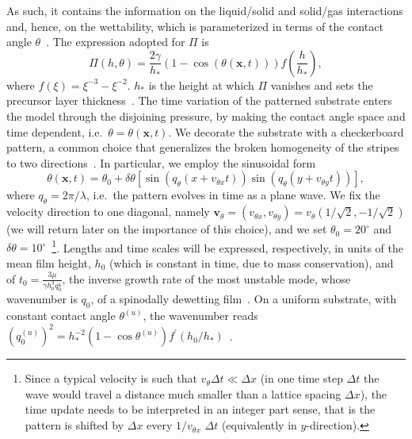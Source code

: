 \documentclass[amsmath,amssymb,showpacs,prf,superscriptaddress, longbibliography]{revtex4-1} %
\begin{document}
As such, it contains the information on the liquid/solid and solid/gas interactions and, hence, on the wettability, which is parameterized in terms of the contact angle $\theta$~\cite{bonnWettingSpreading2009, schwartzSimulationDropletMotion1998}. 
The expression adopted for $\Pi$ is
\begin{equation}\label{eq:disjoinpressure}
\Pi(h,\theta) = \frac{2\gamma}{h_{\ast}}(1-\cos(\theta(\mathbf{x},t)))
  f\left(\frac{h}{h_{\ast}}\right),
\end{equation}
where $f(\xi)=\xi^{-3} - \xi^{-2}$. $h_{\ast}$ is the height at which $\Pi$ vanishes and sets the precursor layer thickness~\cite{SuppMat}.
The time variation of the patterned substrate enters the model through the disjoining pressure, by making the contact angle space and time dependent, i.e.~$\theta = \theta(\mathbf{x},t)$.
We decorate the substrate with a checkerboard pattern, a common choice that generalizes the broken homogeneity of the stripes to two 
directions~\cite{jalaliFabricationCharacterizationScalable2018,nagayamaIntermediateWettingState2020,dasSurfacedirectedSpinodalDecomposition2020}.
In particular, we employ the sinusoidal form
\begin{equation}\label{eq:sinetheta}
   \!\! \theta(\mathbf{x},t) = \theta_0 + \delta\theta\left[\sin\left(q_{\theta} (x+v_{\theta x}t)\right)\sin\left(q_{\theta}(y+v_{\theta y}t)\right)\right],\! 
\end{equation}
where $q_{\theta} = 2\pi/\lambda$, i.e.~the pattern evolves in time as a plane wave.
We fix the velocity direction to one diagonal, namely $\mathbf{v}_{\theta} = (v_{\theta x},v_{\theta y}) = v_{\theta}(1/\sqrt{2},-1/\sqrt{2})$ (we will return later on the importance of this choice), and we set $\theta_0 = 20^{\circ}$ and $\delta\theta=10^{\circ}$~\footnote{Since a typical velocity is such that $v_{\theta} \Delta t \ll \Delta x$ (in one time step $\Delta t$ the wave would travel a distance much smaller than a lattice spacing $\Delta x$),
the time update needs to be interpreted in an integer part sense, that is the pattern is shifted by $\Delta x$ every $1/v_{\theta x}$ $\Delta t$ (equivalently in $y$-direction).}.
Lengths and time scales will be expressed, respectively, in units of the mean film height, $h_0$ (which is constant in time, due to mass conservation), and of $t_0 = \frac{3\mu}{\gamma h_0^3 q_0^4}$, the inverse growth rate of the most unstable mode, whose wavenumber is $q_0$, of a spinodally dewetting film~\cite{meckeThermalFluctuationsThin2005}. 
On a uniform substrate, with constant contact angle $\theta^{(u)}$, the wavenumber reads $(q^{(u)}_0)^2 = h_{\ast}^{-2}(1-\cos \theta^{(u)})f^{\prime}(h_0/h_{\ast})$~\cite{meckeThermalFluctuationsThin2005,zhangMolecularSimulationThin2019}. 
\end{document}
